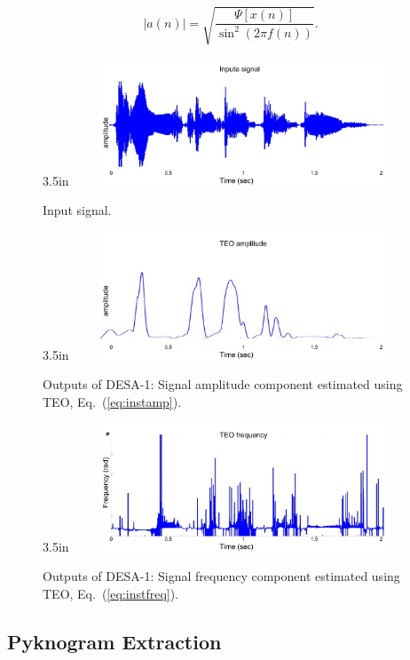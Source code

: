 { 
\begin{equation}
\label{eq:instamp}
|a(n)| = \sqrt{\frac{\Psi[x(n)]}{\sin^2(2\pi f(n))}}.
\end{equation}



\begin{figure}[b]{3.5in}
	\centering
	\includegraphics[height=1.5in, width=4in]{figures/teo_signal}
	\caption{Input signal.}
\end{figure}
	
\vspace{1.0mm}
\begin{figure}[b]{3.5in}
	\centering
	\includegraphics[height=1.5in, width=4in]{figures/teo_amp}
	\caption{Outputs of DESA-1: Signal amplitude component estimated using TEO, Eq.~(\ref{eq:instamp}).}
\end{figure}

\begin{figure}[b]{3.5in}
	\centering
	\includegraphics[height=1.5in, width=4in]{figures/teo_freq}
	\caption{Outputs of DESA-1: Signal frequency component estimated using TEO,  Eq.~(\ref{eq:instfreq}).}
\end{figure}

\subsection{Pyknogram Extraction}
\label{ssec:pyknogram_extraction}

}

